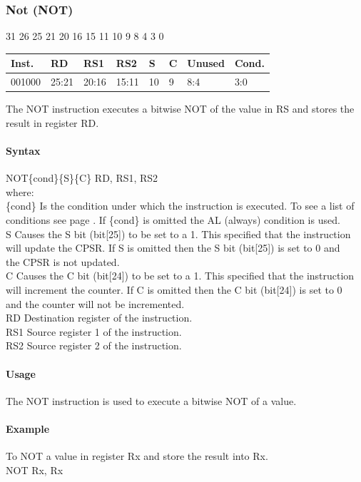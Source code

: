 \documentclass[12pt]{article}
\newcommand{\aTypeInstruction}[6]
{%
    \hspace{1.6cm}31 \hspace{1.15cm}26 \hspace{.04cm}25 \hspace{.8cm}21 \hspace{.04cm}20 \hspace{.8cm}16 \hspace{.04cm}15 \hspace{.8cm}11 \hspace{.04cm}10 \hspace{.275cm}9 \hspace{.275cm}8 \hspace{1.175cm}4 \hspace{.04cm}3 \hspace{1.25cm}0
    \vspace{-.25cm}
    \begin{center}
        \begin{tabular}{ |p{1.8cm}|p{1.5cm}|p{1.5cm}|p{1.5cm}|p{0.3cm}|p{0.3cm}|p{1.5cm}|p{1.5cm}| }
            \hline
            \textbf{Inst.} & \textbf{RD}& \textbf{RS1} & \textbf{RS2} & \textbf{S} & \textbf{C} & Unused & \textbf{Cond.}\\
            \hline
            #1 & 25:21 & 20:16 & 15:11 & 10 & 9 & 8:4 &3:0\\
            \hline
        \end{tabular}
    \end{center}
    
    \noindent
    #2\\
    
    \paragraph{Syntax}
    \begin{flushleft}
    #3\{cond\}\{S\}\{C\} RD, RS1, RS2\\
    \vspace{1em}        %
    where:\\
    \vspace{1em}
    \{cond\}    \hspace{2em} Is the condition under which the instruction is executed. To see a list of\\
                \hspace{5.4em} conditions see page . If \{cond\} is omitted the AL (always) condition is used.\\
    \vspace{1em}    
    S       \hspace{4.5em} Causes the S bit (bit[25]) to be set to a 1. This specified that the instruction\\
            \hspace{5.4em} will update the CPSR. If S is omitted then the S bit (bit[25]) is set to 0 and\\
            \hspace{5.4em} the CPSR is not updated.\\
    \vspace{1em}    
    C       \hspace{4.5em} Causes the C bit (bit[24]) to be set to a 1. This specified that the instruction\\
            \hspace{5.4em} will increment the counter. If C is omitted then the C bit (bit[24]) is set to 0\\
            \hspace{5.4em} and the counter will not be incremented.\\
    \vspace{1em}
    RD  \hspace{3.6em} Destination register of the instruction.\\
    \vspace{1em}
    RS1  \hspace{3.35em} Source register 1 of the instruction.\\
    \vspace{1em}
    RS2  \hspace{3.35em} Source register 2 of the instruction.\\
    \end{flushleft}
    
    \paragraph{Usage}
    \begin{flushleft}
    #4\\
    \end{flushleft}
    \paragraph{Example}
    \begin{flushleft}
    #5\\
    \vspace{1em}
    #6
    \end{flushleft}
    }
\begin{document}
   
   





    \newpage
    \subsubsection{Not (NOT)}
    
    \aTypeInstruction
    {001000}
    {The NOT instruction executes a bitwise NOT of the value in RS and stores the result in register RD.}
    {NOT}
    {The NOT instruction is used to execute a bitwise NOT of a value.}
    {To NOT a value in register Rx and store the result into Rx.}
    {NOT Rx, Rx}
    
    
\end{document}
